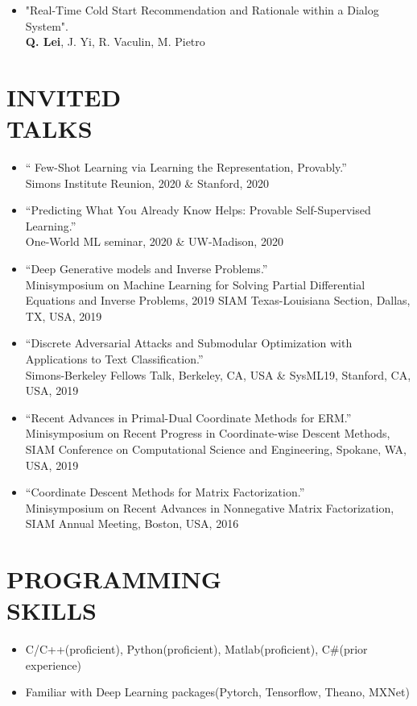\documentclass[margin, 10pt]{res} %
\begin{document}
\begin{resume}
\begin{itemize}
 \item{"Real-Time Cold Start Recommendation and Rationale within a Dialog System".\\
   \textbf{Q. Lei}, J. Yi, R. Vaculin, M. Pietro}
 \end{itemize}

 \section{INVITED\\TALKS}
 \begin{itemize}
	\item{`` Few-Shot Learning via Learning the Representation, Provably.''\\
		Simons Institute Reunion, 2020 \& Stanford, 2020	}
	 \item{``Predicting What You Already Know Helps: Provable Self-Supervised Learning.''\\
		 One-World ML seminar, 2020 \& UW-Madison, 2020	 } 
\item{``Deep Generative models and Inverse Problems.''\\
       Minisymposium on Machine Learning for Solving Partial Differential 
       Equations and Inverse Problems, 2019 SIAM Texas-Louisiana Section, Dallas,
 TX, USA, 2019}

 \item{``Discrete Adversarial Attacks 
 and Submodular Optimization with Applications to Text Classification.''\\ 
 Simons-Berkeley Fellows Talk, Berkeley, CA, USA \& SysML19, Stanford, CA, 
 USA, 2019}

 \item{``Recent 
     Advances in Primal-Dual Coordinate Methods for ERM.''\\
     Minisymposium on Recent Progress in Coordinate-wise Descent Methods, SIAM Conference on Computational Science and Engineering, Spokane, WA, USA, 2019}
 
 \item{``Coordinate Descent Methods for Matrix Factorization.''\\
   Minisymposium on Recent Advances in Nonnegative Matrix Factorization, SIAM 
 Annual Meeting, Boston, USA, 2016}


 \end{itemize}

\section{PROGRAMMING \\ SKILLS} 
\begin{itemize}
	\item[]  C/C++(proficient), Python(proficient), Matlab(proficient), C\#(prior experience)
  \item[]  Familiar with Deep Learning packages(Pytorch, Tensorflow, Theano, MXNet)
\end{itemize}

\end{resume}
\end{document}
